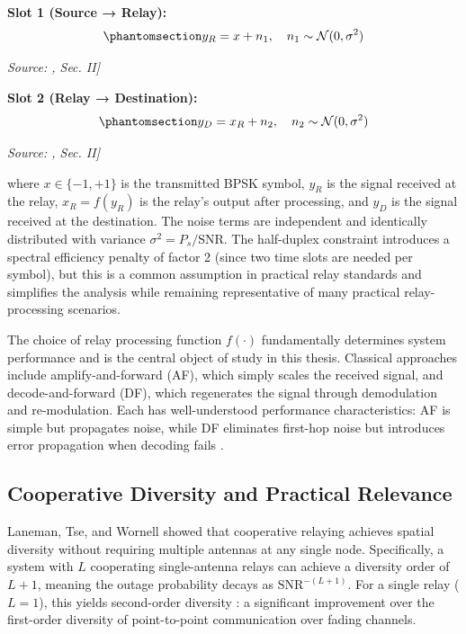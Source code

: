 \textbf{Slot 1 (Source → Relay):} \begin{equation}\protect\phantomsection\label{eq:awgn-hop1}{y_R = x + n_1, \quad n_1 \sim \mathcal{N}(0, \sigma^2)
}\end{equation} \par{\small\textit{Source: \cite{Laneman2004CooperativeDiversity}, Sec. II]}}

\textbf{Slot 2 (Relay → Destination):} \begin{equation}\protect\phantomsection\label{eq:awgn-hop2}{y_D = x_R + n_2, \quad n_2 \sim \mathcal{N}(0, \sigma^2)
}\end{equation} \par{\small\textit{Source: \cite{Laneman2004CooperativeDiversity}, Sec. II]}}

where \(x \in \{-1, +1\}\) is the transmitted BPSK symbol, \(y_R\) is the signal received at the relay, \(x_R = f(y_R)\) is the relay's output after processing, and \(y_D\) is the signal received at the destination. The noise terms are independent and identically distributed with variance \(\sigma^2 = P_s / \text{SNR}\). The half-duplex constraint introduces a spectral efficiency penalty of factor 2 (since two time slots are needed per symbol), but this is a common assumption in practical relay standards and simplifies the analysis while remaining representative of many practical relay-processing scenarios.

The choice of relay processing function \(f(\cdot)\) fundamentally determines system performance and is the central object of study in this thesis. Classical approaches include amplify-and-forward (AF), which simply scales the received signal, and decode-and-forward (DF), which regenerates the signal through demodulation and re-modulation. Each has well-understood performance characteristics: AF is simple but propagates noise, while DF eliminates first-hop noise but introduces error propagation when decoding fails \cite{CoverGamal1979RelayChannel}.

\subsection{Cooperative Diversity and Practical Relevance}\label{sec:cooperative-diversity-and-practical-relevance}

Laneman, Tse, and Wornell \cite{Laneman2004CooperativeDiversity} showed that cooperative relaying achieves spatial diversity without requiring multiple antennas at any single node. Specifically, a system with \(L\) cooperating single-antenna relays can achieve a diversity order of \(L + 1\), meaning the outage probability decays as \(\text{SNR}^{-(L+1)}\). For a single relay (\(L=1\)), this yields second-order diversity : a significant improvement over the first-order diversity of point-to-point communication over fading channels.

